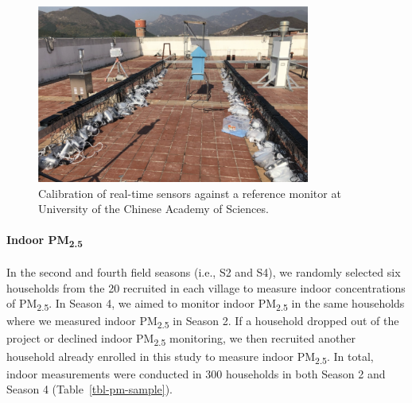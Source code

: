 \documentclass[
  letterpaper,
  DIV=11,
  numbers=noendperiod]{scrartcl}
\let\oldparagraph\paragraph
\renewcommand{\paragraph}[1]{\oldparagraph{#1}\mbox{}}
\begin{document}
\begin{figure}[H]

{\centering \includegraphics[width=0.8\textwidth,height=\textheight]{images/sensor-calibration.png}

}

\caption{\label{fig-calibration}Calibration of real-time sensors against
a reference monitor at University of the Chinese Academy of Sciences.}

\end{figure}

\hypertarget{indoor-pm2.5}{%
\paragraph{\texorpdfstring{Indoor
PM\textsubscript{2.5}}{Indoor PM2.5}}\label{indoor-pm2.5}}

In the second and fourth field seasons (i.e., S2 and S4), we randomly
selected six households from the 20 recruited in each village to measure
indoor concentrations of PM\textsubscript{2.5}. In Season 4, we aimed to
monitor indoor PM\textsubscript{2.5} in the same households where we
measured indoor PM\textsubscript{2.5} in Season 2. If a household
dropped out of the project or declined indoor PM\textsubscript{2.5}
monitoring, we then recruited another household already enrolled in this
study to measure indoor PM\textsubscript{2.5}. In total, indoor
measurements were conducted in 300 households in both Season 2 and
Season 4 (Table~\ref{tbl-pm-sample}).
\end{document}
